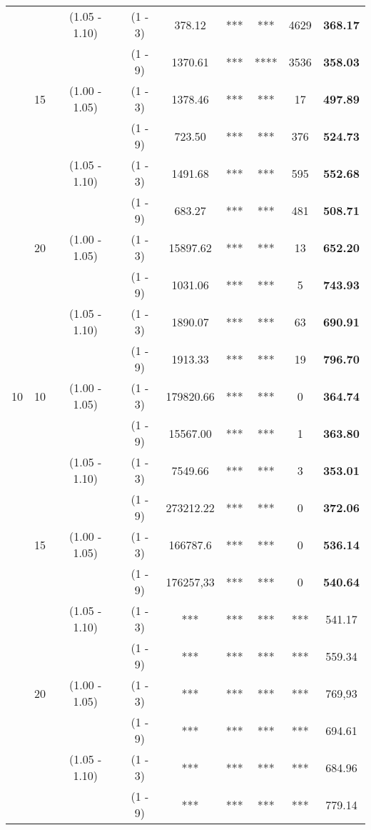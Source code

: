 \documentclass[a4paper,11pt]{article}
\begin{document}
\begin{table}[!ht]
\begin{tabular}{|c|c|c|c|c|c|c |c|c|}
   &    & (1.05 - 1.10) & (1 - 3) & 		   378.12 & *** & *** & 4629 & \textbf{368.17} \\
   &    &  & (1 - 9) & 						   1370.61 & *** & **** & 3536 & \textbf{358.03} \\
   & 15 & (1.00 - 1.05) & (1 - 3) & 		   1378.46 & *** & *** & 17 & \textbf{497.89} \\
   &    &  & (1 - 9) & 						   723.50 & *** & *** & 376& \textbf{524.73} \\
   &    & (1.05 - 1.10) & (1 - 3) & 		   1491.68 & *** & *** & 595 & \textbf{552.68} \\
   &    &  & (1 - 9) & 						   683.27 & *** & *** & 481 & \textbf{508.71} \\
   & 20 & (1.00 - 1.05) & (1 - 3) & 		   15897.62 & *** & ***  & 13 & \textbf{652.20} \\
   &    &  & (1 - 9) & 						   1031.06 & *** & *** &  5 & \textbf{743.93} \\
   &    & (1.05 - 1.10) & (1 - 3) & 		   1890.07 & ***  & *** &  63& \textbf{690.91} \\
   &    &  & (1 - 9) & 						   1913.33 & *** & *** &  19 & \textbf{796.70} \\
10 & 10 & (1.00 - 1.05) & (1 - 3) & 		   179820.66 & *** & *** & 0 & \textbf{364.74} \\
   &    &  & (1 - 9) &						   15567.00 & *** & *** &  1& \textbf{363.80} \\
   &    & (1.05 - 1.10) & (1 - 3) & 		   7549.66 & *** & *** & 3 & \textbf{353.01} \\
   &    &  & (1 - 9) & 						   273212.22 & ***  & *** & 0 & \textbf{372.06} \\
   & 15 & (1.00 - 1.05) & (1 - 3) & 		   166787.6 & *** & *** & 0 & \textbf{536.14} \\
   &    &  & (1 - 9) & 						   176257,33 & ***  & *** & 0 & \textbf{540.64} \\
   &    & (1.05 - 1.10) & (1 - 3) & 			*** &*** &*** &*** &  541.17   \\
   &    &  & (1 - 9) & 							*** &*** &*** &*** &  559.34 \\
   & 20 & (1.00 - 1.05) & (1 - 3) & 			*** &*** &*** &*** &  769,93 \\
   &    &  & (1 - 9) & 							*** &*** &*** &*** &  694.61 \\
   &    & (1.05 - 1.10) & (1 - 3) & 			*** &*** &*** &*** &  684.96 \\
   &    &  & (1 - 9) & 							*** &*** &*** &*** &  779.14 \\

\end{tabular}
\end{table}
\end{document}
